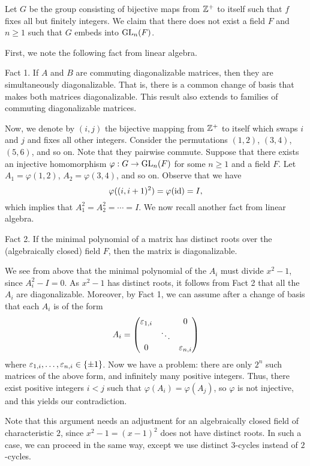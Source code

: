 \begin{exmp}
Let $G$ be the group consisting of bijective maps from $\mathbb{Z}^+$ to itself such that $f$ fixes all
but finitely integers. We claim that there does not exist a field $F$ and $n \geq 1$ such that 
$G$ embeds into $\operatorname{GL}_n(F)$. 

\begin{pf} 
First, we note the following fact from linear algebra.

{\sc Fact 1.} If $A$ and $B$ are commuting diagonalizable matrices, then they are simultaneously 
diagonalizable. That is, there is a common change of basis that makes both matrices diagonalizable.
This result also extends to families of commuting diagonalizable matrices. 

Now, we denote by $(i, j)$ the bijective mapping from $\mathbb{Z}^+$ to itself which swaps $i$ and $j$ 
and fixes all other integers. Consider the permutations $(1, 2)$, $(3, 4)$, $(5, 6)$, and so on. 
Note that they pairwise commute. Suppose that there exists an injective homomorphism 
$\varphi: G \to \operatorname{GL}_n(F)$ for some $n \geq 1$ and a field $F$. Let $A_1 = \varphi(1, 2)$, 
$A_2 = \varphi(3, 4)$, and so on. Observe that we have 
\[ \varphi((i, i+1)^2) = \varphi(\operatorname{id}) = I, \]
which implies that $A_1^2 = A_2^2 = \cdots = I$. We now recall another fact from linear algebra. 

{\sc Fact 2.} If the minimal polynomial of a matrix has distinct roots over the (algebraically closed) field $F$, then the matrix is diagonalizable. 

We see from above that the minimal polynomial of the $A_i$ must divide $x^2 - 1$, since 
$A_i^2 - I = 0$. As $x^2 - 1$ has distinct roots, it follows from Fact 2 that all the $A_i$ are diagonalizable. Moreover, by Fact 1, we can assume after a change of basis that each $A_i$ is of the form 
\[ A_i = \begin{pmatrix} \varepsilon_{1,i} & & 0 \\ & \ddots & \\ 0 & & \varepsilon_{n,i} \end{pmatrix} \]
where $\varepsilon_{1,i}, \dots, \varepsilon_{n,i} \in \{\pm 1\}$. Now we have a problem: there are only 
$2^n$ such matrices of the above form, and infinitely many positive integers. Thus, there 
exist positive integers $i < j$ such that $\varphi(A_i) = \varphi(A_j)$, so 
$\varphi$ is not injective, and this yields our contradiction.

Note that this argument needs an adjustment for an algebraically closed field of characteristic $2$, 
since $x^2 - 1 = (x - 1)^2$ does not have distinct roots. 
In such a case, we can proceed in the same way, except we use distinct $3$-cycles instead of $2$-cycles.
\end{pf}
\end{exmp}


